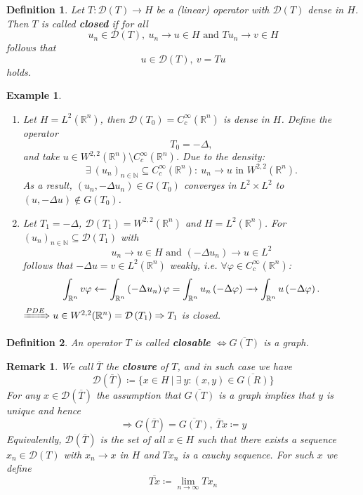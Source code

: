\documentclass[12pt]{extreport} %
\newcommand{\N}{\mathbb{N}}
\newcommand{\R}{\mathbb{R}}
\newcommand{\DO}[1]{\mathcal{D}\left( {#1} \right)}
\theoremstyle{named}
\theoremstyle{nnamed}
\theoremstyle{itshape}
\newtheorem{definition}{Definition}  \counterwithin{definition}{chapter}
\theoremstyle{normal}
\newtheorem*{example}{Example}
\newtheorem*{remark}{Remark}
\begin{document}
 
\begin{definition} \label{i.1:def}
	Let $T \colon \DO{T} \rightarrow H$ be a (linear) operator with $\DO{T}$ dense in $H$. Then $T$ is called \textbf{closed} if for all 
		$$ u_n \in \DO{T}, ~ u_n \rightarrow u \in H \text{ and } T u_n \rightarrow v \in H $$
	follows that
		$$ u \in \DO{T}, ~ v = T u $$
	holds.
\end{definition}

\begin{example} ~\
	\begin{enumerate}
		\item Let $H = L^2(\R^n)$, then $\DO{T_{0}} = C_c^\infty(\R^n)$ is dense in $H$. Define the operator
			$$ T_0 = - \Delta,  $$
			and take $u \in W^{2,2}(\R^n) \setminus C_c^{\infty}(\R^n)$. Due to the density:
			$$ \exists ~(u_n)_{n \in \N} \subseteq C_c^{\infty}(\R^n) \colon ~ u_n \rightarrow u \text{ in } W^{2,2}(\R^n). $$
			As a result, $\left( u_n, -\Delta u_n \right) \in G(T_0)$ converges in $L^2 \times L^2$ to $(u, -\Delta u) \notin G(T_0)$.
		\item Let $T_1 = - \Delta$, $\DO{T_1} = W^{2,2}(\R^n)$ and $H = L^2(\R^n)$. For $(u_n)_{n \in \N} \subseteq \DO{T_1}$ with 
			$$ u_n \rightarrow u \in H \text{ and } \left( - \Delta u_n \right) \rightarrow u \in L^2 $$
			follows that $- \Delta u = v \in L^2(\R^n)$ weakly, i.e. $\forall \varphi \in C_c^{\infty}(\R^n)$:
			$$ \int_{\R^n} v \varphi \leftArrow \int_{\R^n} \left( - \Delta u_n \right) \varphi = \int_{\R^n} u_n \left( - \Delta \varphi \right) \rightArrow \int_{\R^n} u \left( - \Delta \varphi \right). $$
			$\xRightarrow[]{PDE} u \in W^{2,2}(\R^n) = \DO{T_1} \Rightarrow T_1$ is closed.
	\end{enumerate}
\end{example}

 
\begin{definition}
	An operator $T$ is called \textbf{closable} $\iff \overline{G(T)}$ is a graph.
\end{definition}

 
\begin{remark}
	We call $\overline{T}$ the \textbf{closure} of $T$, and in such case we have 
	$$ \DO{\overline{T}} \coloneqq \big\{ x \in H ~ \big| ~ \exists ~ y \colon (x, y) \in \overline{G(R)} \big\} $$	
	For any $x \in \DO{\overline{T}}$ the assumption that $\overline{G(T)}$ is a graph implies that $y$ is unique and hence
	$$ \Rightarrow G(\overline{T}) = \overline{G(T)}, ~\overline{T} x \coloneqq y $$
	Equivalently, $\DO{\overline{T}}$ is the set of all $x \in H$ such that there exists a sequence $x_n \in \DO{T}$ with $x_n \rightarrow x$ in $H$ and $T x_n$ is a cauchy sequence. For such $x$ we define
	$$ \overline{Tx} \coloneqq \lim_{n \rightarrow \infty} T x_n $$
\end{remark}
\end{document}

